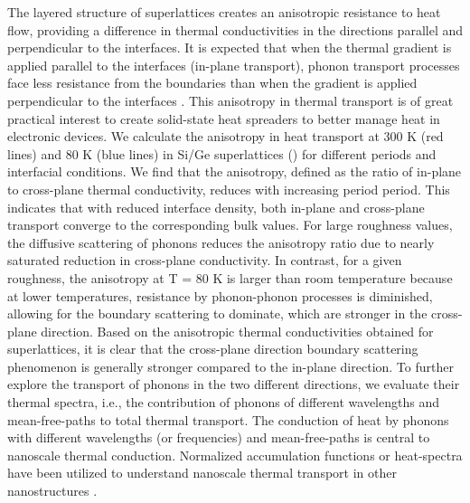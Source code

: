 \par The layered structure of superlattices creates an anisotropic resistance to heat flow, providing a difference in thermal conductivities in the directions parallel and perpendicular to the interfaces. It is expected that when the thermal gradient is applied parallel to the interfaces (in-plane transport), phonon transport processes face less resistance from the boundaries than when the gradient is applied perpendicular to the interfaces \cite{book_Ziman}. This anisotropy in thermal transport is of great practical interest to create solid-state heat spreaders to better manage heat in electronic devices. We calculate the anisotropy in heat transport at 300 K (red lines) and 80 K (blue lines) in Si/Ge superlattices () for different periods and interfacial conditions. We find that the anisotropy, defined as the ratio of in-plane to cross-plane thermal conductivity, reduces with increasing period \gls{period}. This indicates that with reduced interface density, both in-plane and cross-plane transport converge to the corresponding bulk values. For large roughness values, the diffusive scattering of phonons reduces the anisotropy ratio due to nearly saturated reduction in cross-plane conductivity. In contrast, for a given roughness, the anisotropy at \gls{T} = 80 K is larger than room temperature because at lower temperatures, resistance by phonon-phonon processes is diminished, allowing for the boundary scattering to dominate, which are stronger in the cross-plane direction. Based on the anisotropic thermal conductivities obtained for superlattices, it is clear that the cross-plane direction boundary scattering phenomenon is generally stronger compared to the in-plane direction. To further explore the transport of phonons in the two different directions, we evaluate their thermal spectra, i.e., the contribution of phonons of different wavelengths and mean-free-paths to total thermal transport. The conduction of heat by phonons with different wavelengths (or frequencies) and mean-free-paths is central to nanoscale thermal conduction. Normalized accumulation functions or heat-spectra have been utilized to understand nanoscale thermal transport in other nanostructures \cite{ownNW,RN236}.
